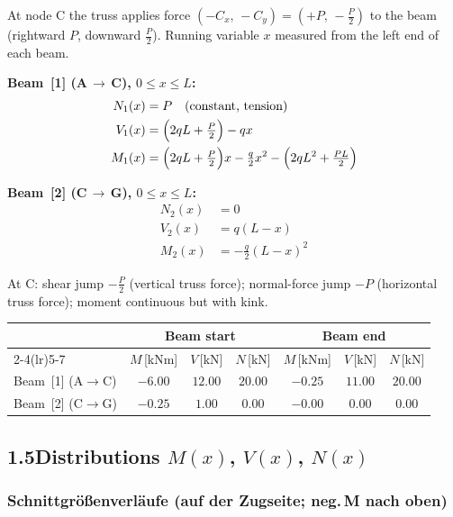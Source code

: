 \documentclass[a4paper,11pt]{article}
\begin{document}
At node C the truss applies force $(-C_x,\,-C_y) = (+P,\,-\tfrac{P}{2})$
to the beam (rightward $P$, downward $\tfrac{P}{2}$).
Running variable $x$ measured from the left end of each beam.

\textbf{Beam~[1] (A\,$\to$\,C), $0 \le x \le L$:}
\begin{align*}
  N_1(x) &= P \quad\text{(constant, tension)} \\
  V_1(x) &= \Bigl(2qL + \tfrac{P}{2}\Bigr) - qx \\
  M_1(x) &= \Bigl(2qL + \tfrac{P}{2}\Bigr)x - \tfrac{q}{2}x^2
            - \Bigl(2qL^2 + \tfrac{PL}{2}\Bigr)
\end{align*}

\textbf{Beam~[2] (C\,$\to$\,G), $0 \le x \le L$:}
\begin{align*}
  N_2(x) &= 0 \\
  V_2(x) &= q(L - x) \\
  M_2(x) &= -\tfrac{q}{2}(L - x)^2
\end{align*}

At C: shear jump $-\tfrac{P}{2}$ (vertical truss force);
normal-force jump $-P$ (horizontal truss force); moment continuous but with kink.

\medskip
\begin{center}
\begin{tabular}{l cccccc}
\toprule
 & \multicolumn{3}{c}{\textbf{Beam start}} & \multicolumn{3}{c}{\textbf{Beam end}} \\
\cmidrule(lr){2-4}\cmidrule(lr){5-7}
 & $M$\,[kNm] & $V$\,[kN] & $N$\,[kN]
 & $M$\,[kNm] & $V$\,[kN] & $N$\,[kN] \\
\midrule
Beam~[1] (A$\to$C) & $-6.00$ & $12.00$ & $20.00$ & $-0.25$ & $11.00$ & $20.00$ \\[3pt]
Beam~[2] (C$\to$G) & $-0.25$ & $1.00$ & $0.00$ & $-0.00$ & $0.00$ & $0.00$ \\
\bottomrule
\end{tabular}
\end{center}

\subsection*{1.5\quad Distributions $M(x)$, $V(x)$, $N(x)$}


\subsubsection*{Schnittgrößenverläufe (auf der Zugseite; neg.\,M nach oben)}
\end{document}
